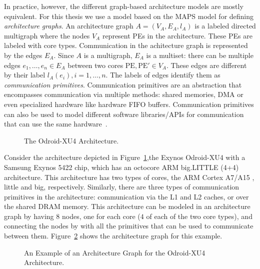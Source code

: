 In practice, however, the different graph-based architecture models are mostly equivalent.
For this thesis we use a model based on the \ac{MAPS} model for defining \emph{architecture graphs}.
An architecture graph $A = (V_A,E_A,l_A)$ is a labeled directed multigraph where the nodes $V_A$ represent \acp{PE} in the architecture. These \acp{PE} are labeled with core types. %
Communication in the achitecture graph is represented by the edges $E_A$. Since $A$ is a multigraph, $E_A$ is a multiset: there can be multiple edges $e_1,\ldots,e_n \in E_A$ between two cores $\text{PE},\text{PE}' \in V_A$.
These edges are different by their label $l_A(e_i), i = 1,\ldots,n$. The labels of edges identify them as \emph{communication primitives}.
Communication primitives are an abstraction that encompasses communication via multiple methods: shared memories, \ac{DMA} or even specialized hardware like hardware \ac{FIFO} buffers.
Communication primitives can also be used to model different software libraries/\acp{API} for communication that can use the same hardware~\cite{odendahl2013split}.

\begin{figure}[h]
	\centering
\resizebox{0.3\textwidth}{!}{
   \begin{tikzpicture}
     
   \end{tikzpicture}
 }
   \caption{The Odroid-XU4 Architecture.}
   \label{fig:odroid}
\end{figure}

Consider the architecture depicted in Figure~\ref{fig:odroid},the Exynos Odroid-XU4 with a Samsung Exynos 5422 chip, which has an octocore ARM big.LITTLE (4+4) architecture. 
This architecture has two types of cores, the ARM Cortex A7/A15 , little and  big, respectively. Similarly, there are three types of communication primitives in the architecture:
communication via the L1 and L2 caches, or over the shared DRAM memory.
This architecture can be modeled in an architecture graph by having $8$ nodes, one for each core ($4$ of each of the two core types), and connecting the nodes by with all the primitives that can be used to communicate between them.
Figure~\ref{fig:architecture_graph_odroid} shows the architecture graph for this example.

\begin{figure}[h]
	\centering
\resizebox{0.8\textwidth}{!}{
   \begin{tikzpicture}
     
   \end{tikzpicture}
 }
   \caption{An Example of an Architecture Graph for the Odroid-XU4 Architecture.}
   \label{fig:architecture_graph_odroid}
\end{figure}

